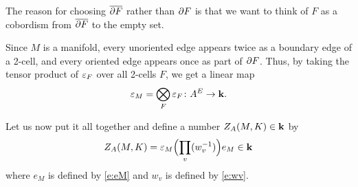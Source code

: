 \begin{remark}
  The reason for choosing $\overline{\partial F}$ rather than $\partial F$ is that we want
  to think of $F$ as a cobordism from $\overline{\partial F}$ to the empty set.
\end{remark}

Since $M$ is a manifold, every unoriented edge appears twice as a boundary
edge of a 2-cell, and every oriented edge appears once as part of $\partial F$.
Thus, by taking the tensor product of $\varepsilon_F$ over all 2-cells $F$, we
get a linear map
$$
  \varepsilon_M = \bigotimes_F \varepsilon_F \colon A^E\to \mathbf{k}.
$$

Let us now put it all together and define a number $Z_A(M,K)\in \mathbf{k}$ by
\begin{equation}\label{e:fhk-state-sum}
  Z_A(M,K)= \varepsilon_M
          \Bigl(\prod_v(w^{-1}_v) \Bigr)e_M\in \mathbf{k}
\end{equation}
where $e_M$ is defined by \eqref{e:eM} and $w_v$ is defined by \eqref{e:wv}.


